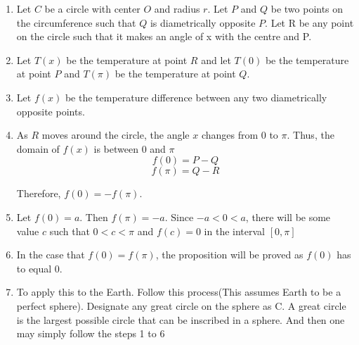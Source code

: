 \documentclass{article}
\begin{document}
\begin{enumerate}

\item Let \( C \) be a circle with center \( O \) and radius \( r \). Let \( P \) and \( Q \) be two points on the circumference such that \( Q \) is diametrically opposite \( P \). Let R be any point on the circle such that it makes an angle of x with the centre and P.


\item  Let \( T(x) \) be the temperature at point \( R \) and let \( T(0) \) be the temperature at point \( P \) and \( T(\pi) \) be the temperature at point \( Q \).

\item Let $f(x)$ be the temperature difference between any two diametrically opposite points.

\item As \( R \) moves around the circle, the angle \( x \) changes from \( 0 \) to \( \pi \). Thus, the domain of $f(x)$ is between 0 and $\pi$
   \[
   f(0) = P - Q
   \]
   \[
   f(\pi) = Q - R
   \]

Therefore, $f(0) = - f(\pi)$.

\item Let $f(0) = a$. Then $f(\pi) = -a$. Since $-a< 0 <a$, there will be some value $c$ such that $0<c<\pi$ and $f(c) = 0$ in the interval $[0,\pi]$

\item In the case that $f(0) = f(\pi)$, the proposition will be proved as $f(0)$ has to equal 0.

\item To apply this to the Earth. Follow this process(This assumes Earth to be a perfect sphere). Designate any great circle on the sphere as C. A great circle is the largest possible circle that can be inscribed in a sphere. And then one may simply follow the steps 1 to 6 

\end{enumerate}
\end{document}
